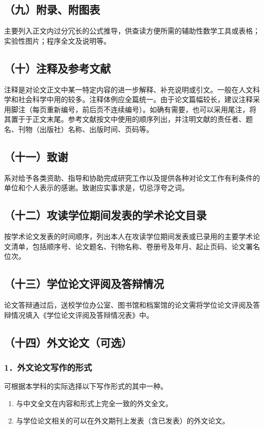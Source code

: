 \subsection{（九）附录、附图表}
主要列入正文内过分冗长的公式推导，供查读方便所需的辅助性数学工具或表格；实验性图片；程序全文及说明等。

\subsection{（十）注释及参考文献}
注释是对论文正文中某一特定内容的进一步解释、补充说明或引文。一般在人文科学和社会科学中用的较多。注释体例应全篇统一。由于论文篇幅较长，建议注释采用脚注（每页重新编号，前后页不连续编号）。如确有需要，也可以采用尾注，将其置于于正文末尾。参考文献按文中使用的顺序列出，并注明文献的责任者、题名、刊物（出版社）名称、出版时间、页码等。

\subsection{（十一）致谢}
系对给予各类资助、指导和协助完成研究工作以及提供各种对论文工作有利条件的单位和个人表示的感谢。致谢应实事求是，切忌浮夸之词。

\subsection{（十二）攻读学位期间发表的学术论文目录}
按学术论文发表的时间顺序，列出本人在攻读学位期间发表或已录用的主要学术论文清单，包括顺序号、论文题名、刊物名称、卷册号及年月、起止页码、论文署名位次。

\subsection{（十三）学位论文评阅及答辩情况}
论文答辩通过后，送校学位办公室、图书馆和档案馆的论文需将学位论文评阅及答辩情况填入《学位论文评阅及答辩情况表》中。

\subsection{（十四）外文论文（可选）}
\subsubsection*{1．外文论文写作的形式}
可根据本学科的实际选择以下写作形式的其中一种。
\begin{enumerate}
\item[①] 与中文全文在内容和形式上完全一致的外文全文。
\item[②] 与学位论文相关的可以在外文期刊上发表（含已发表）的外文论文。
\end{enumerate}
